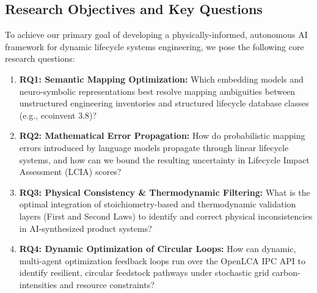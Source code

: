 \documentclass[11pt]{article}
\begin{document}
\subsection{Research Objectives and Key Questions}
To achieve our primary goal of developing a physically-informed, autonomous AI framework for dynamic lifecycle systems engineering, we pose the following core research questions:
\begin{enumerate}
    \item \textbf{RQ1: Semantic Mapping Optimization:} Which embedding models and neuro-symbolic representations best resolve mapping ambiguities between unstructured engineering inventories and structured lifecycle database classes (e.g., ecoinvent 3.8)?
    \item \textbf{RQ2: Mathematical Error Propagation:} How do probabilistic mapping errors introduced by language models propagate through linear lifecycle systems, and how can we bound the resulting uncertainty in Lifecycle Impact Assessment (LCIA) scores?
    \item \textbf{RQ3: Physical Consistency \& Thermodynamic Filtering:} What is the optimal integration of stoichiometry-based and thermodynamic validation layers (First and Second Laws) to identify and correct physical inconsistencies in AI-synthesized product systems?
    \item \textbf{RQ4: Dynamic Optimization of Circular Loops:} How can dynamic, multi-agent optimization feedback loops run over the OpenLCA IPC API to identify resilient, circular feedstock pathways under stochastic grid carbon-intensities and resource constraints?
\end{enumerate}
\end{document}
